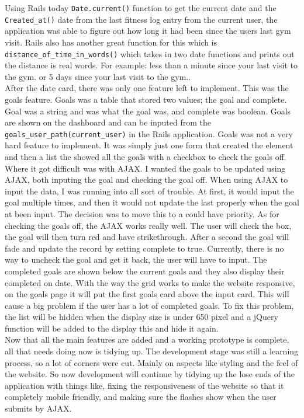Using Rails today \lstinline{Date.current()} function to get the current date and the \lstinline{Created_at()} date from the last fitness log entry from the current user, the application was able to figure out how long it had been since the users last gym visit. Rails also has another great function for this which is \lstinline{distance_of_time_in_words()} which takes in two date functions and prints out the distance is real words. For example: less than a minute since your last visit to the gym. or 5 days since your last visit to the gym..\\

After the date card, there was only one feature left to implement. This was the goals feature. Goals was a table that stored two values; the goal and complete. Goal was a string and was what the goal was, and complete was boolean. Goals are shown on the dashboard and can be inputed from the \lstinline{goals_user_path(current_user)} in the Rails application. Goals was not a very hard feature to implement. It was simply just one form that created the element and then a list the showed all the goals with a checkbox to check the goals off. Where it got difficult was with AJAX. I wanted the goals to be updated using AJAX, both inputing the goal and checking the goal off. When using AJAX to input the data, I was running into all sort of trouble. At first, it would input the goal multiple times, and then it would not update the last properly when the goal at been input. The decision was to move this to a could have priority. As for checking the goals off, the AJAX works really well. The user will check the box, the goal will then turn red and have strikethrough. After a second the goal will fade and update the record by setting complete to true. Currently, there is no way to uncheck the goal and get it back, the user will have to input. The completed goals are shown below the current goals and they also display their completed on date. With the way the grid works to make the website responsive, on the goals page it will put the first goals card above the input card. This will cause a big problem if the user has a lot of completed goals. To fix this problem, the list will be hidden when the display size is under 650 pixel and a jQuery function will be added to the display this and hide it again.\\

Now that all the main features are added and a working prototype is complete, all that needs doing now is tidying up. The development stage was still a learning process, so a lot of corners were cut. Mainly on aspects like styling and the feel of the website. So now development will continue by tidying up the lose ends of the application with things like, fixing the responsiveness of the website so that it completely mobile friendly, and making sure the flashes show when the user submits by AJAX.\\

